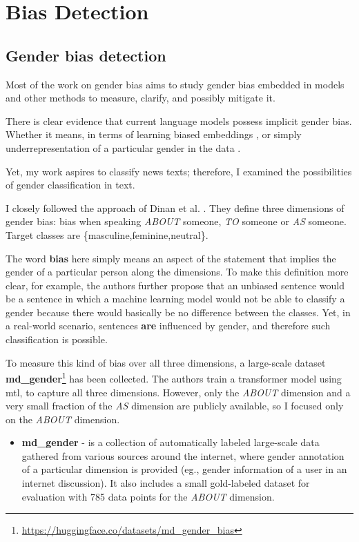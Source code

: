 \chapter{Bias Detection}

\section{Gender bias detection}\label{gender}
Most of the work on gender bias aims to study gender bias embedded in models and other methods to measure, clarify, and possibly mitigate it.

There is clear evidence that current language models possess implicit gender bias. Whether it means, in terms of learning biased embeddings \cite{bolukbasi2016man}, or simply underrepresentation of a particular gender in the data \cite{sun-peng-2021-men}. 

Yet, my work aspires to classify news texts; therefore, I examined the possibilities of gender classification in text.

I closely followed the approach of Dinan et al. \cite{dinan2020multi}. They define three dimensions of gender bias: bias when speaking \textit{ABOUT} someone, \textit{TO} someone or \textit{AS} someone. Target classes are \{masculine,feminine,neutral\}. 

The word \textbf{bias} here simply means an aspect of the statement that implies the gender of a particular person along the dimensions. To make this definition more clear, for example, the authors further propose that an unbiased sentence would be a sentence in which a machine learning model would not be able to classify a gender because there would basically be no difference between the classes. Yet, in a real-world scenario, sentences \textbf{are} influenced by gender, and therefore such classification is possible.

To measure this kind of bias over all three dimensions, a large-scale dataset \textbf{md\_gender}\footnote{\url{https://huggingface.co/datasets/md_gender_bias}} has been collected. The authors train a transformer model using \Gls{mtl}, to capture all three dimensions. However, only the \textit{ABOUT} dimension and a very small fraction of the \textit{AS} dimension are publicly available, so I focused only on the \textit{ABOUT} dimension.

\begin{itemize}
\item \textbf{md\_gender} - is a collection of automatically labeled large-scale data gathered from various sources around the internet, where gender annotation of a particular dimension is provided (eg., gender information of a user in an internet discussion). It also includes a small gold-labeled dataset for evaluation with 785 data points for the \textit{ABOUT} dimension.
\end{itemize}

